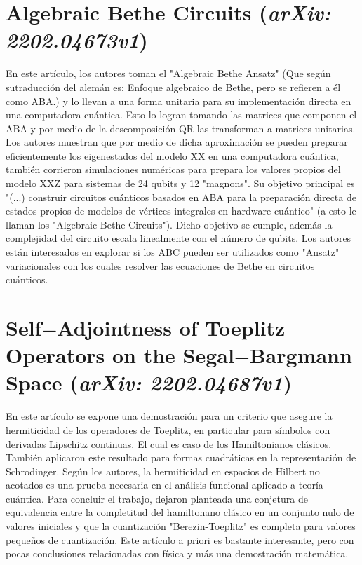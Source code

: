 \section{Algebraic Bethe Circuits (\textit{arXiv: 2202.04673v1})}
\justify
En este artículo, los autores toman el "Algebraic Bethe Ansatz" (Que según sutraducción del alemán es: Enfoque algebraico de Bethe, pero se refieren a él como ABA.) y lo llevan a una forma unitaria para su implementación directa en una computadora cuántica. Esto lo logran tomando las matrices que componen el ABA y por medio de la descomposición QR las transforman a matrices unitarias. Los autores muestran que por medio de dicha aproximación se pueden preparar eficientemente los eigenestados del modelo XX en una computadora cuántica, también corrieron simulaciones numéricas para prepara los valores propios del modelo XXZ para sistemas de 24 qubits y 12 "magnons". Su objetivo principal es "(...) construir circuitos cuánticos basados en ABA para la preparación directa de estados propios de modelos de vértices integrales en hardware cuántico" (a esto le llaman los "Algebraic Bethe Circuits"). Dicho objetivo se cumple, además la complejidad del circuito escala linealmente con el número de qubits. Los autores están interesados en explorar si los ABC pueden ser utilizados como "Ansatz" variacionales con los cuales resolver las ecuaciones de Bethe en circuitos cuánticos.

\section{Self$-$Adjointness of Toeplitz Operators on the Segal$-$Bargmann Space (\textit{arXiv: 2202.04687v1})}
\justify
En este artículo se expone una demostración para un criterio que asegure la hermiticidad de los operadores de Toeplitz, en particular para símbolos con derivadas Lipschitz continuas. El cual es caso de los Hamiltonianos clásicos. También aplicaron este resultado para formas cuadráticas en la representación de Schrodinger. Según los autores, la hermiticidad en espacios de Hilbert no acotados es una prueba necesaria en el análisis funcional aplicado a teoría cuántica. Para concluir el trabajo, dejaron planteada una conjetura de equivalencia entre la completitud del hamiltonano clásico en un conjunto nulo de valores iniciales y que la cuantización "Berezin-Toeplitz" es completa para valores pequeños de cuantización. Este artículo a priori es bastante interesante, pero con pocas conclusiones relacionadas con física y más una demostración matemática.

